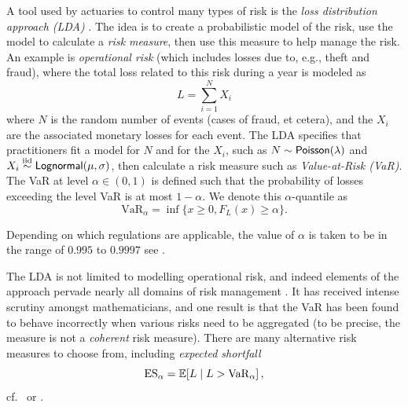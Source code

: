 \begin{example}

A tool used by actuaries to control many types of risk is the \emph{loss distribution approach (LDA)} \cite{frachot2003loss}. The idea is to create a probabilistic model of the risk, use the model to calculate a \emph{risk measure}, then use this measure to help manage the risk. An example is \emph{operational risk} (which includes losses due to, e.g., theft and fraud), where the total loss related to this risk during a year is modeled as
\[ L = \sum_{i=1}^N X_i \]
where $N$ is the random number of events (cases of fraud, et cetera), and the $X_i$ are the associated monetary losses for each event. The LDA specifies that practitioners fit a model for $N$ and for the $X_i$, such as $N\sim\mathsf{Poisson}(\lambda)$ and $X_i \overset{\smash{\mathrm{iid}}}{\sim} \mathsf{Lognormal}(\mu,\sigma)$, then calculate a risk measure such as \emph{Value-at-Risk (VaR)}. The VaR at level $\alpha \in (0,1)$ is defined such that the probability of losses exceeding the level VaR is at most $1-\alpha$. We denote this $\alpha$-quantile as
\begin{equation*}
\mathrm{VaR}_\alpha = \inf\{x\geq0, F_{L}(x)\geq \alpha\}.
\end{equation*}

Depending on which regulations are applicable, the value of $\alpha$ is taken to be in the range of $0.995$ to $0.9997$ see \cite{EIOPA,frachot2001loss}.

The LDA is not limited to modelling operational risk, and indeed elements of the approach pervade nearly all domains of risk management \cite{mcneil2015quantitative}. It has received intense scrutiny amongst mathematicians, and one result is that the VaR has been found to behave incorrectly when various risks need to be aggregated (to be precise, the measure is not a \emph{coherent} risk measure). There are many alternative risk measures to choose from, including \emph{expected shortfall}
\[ \mathrm{ES}_\alpha = \operatorname{{\mathbb E}}[ L \mid L > \mathrm{VaR}_\alpha ] \,, \]
cf.\ \cite{mcneil2015quantitative} or \cite{kluppelberg2014risk}.
\remQED
\end{example}

